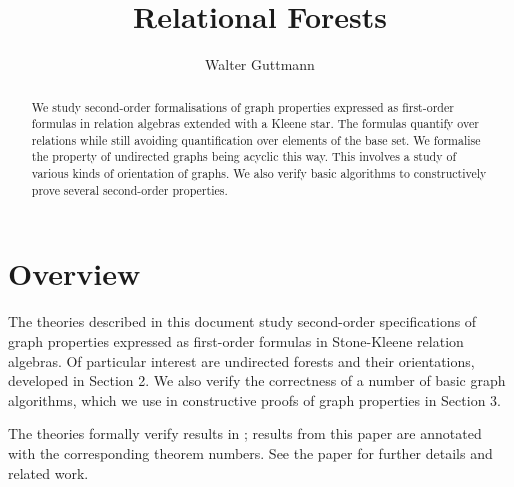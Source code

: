 \documentclass[11pt,a4paper]{article}
\begin{document}
\title{Relational Forests}
\author{Walter Guttmann}
\maketitle

\begin{abstract}
  We study second-order formalisations of graph properties expressed as first-order formulas in relation algebras extended with a Kleene star.
  The formulas quantify over relations while still avoiding quantification over elements of the base set.
  We formalise the property of undirected graphs being acyclic this way.
  This involves a study of various kinds of orientation of graphs.
  We also verify basic algorithms to constructively prove several second-order properties.
\end{abstract}

\tableofcontents

\section{Overview}

The theories described in this document study second-order specifications of graph properties expressed as first-order formulas in Stone-Kleene relation algebras.
Of particular interest are undirected forests and their orientations, developed in Section 2.
We also verify the correctness of a number of basic graph algorithms, which we use in constructive proofs of graph properties in Section 3.

The theories formally verify results in \cite{Guttmann2021b}; results from this paper are annotated with the corresponding theorem numbers.
See the paper for further details and related work.

\begin{flushleft}

\end{flushleft}



\end{document}
